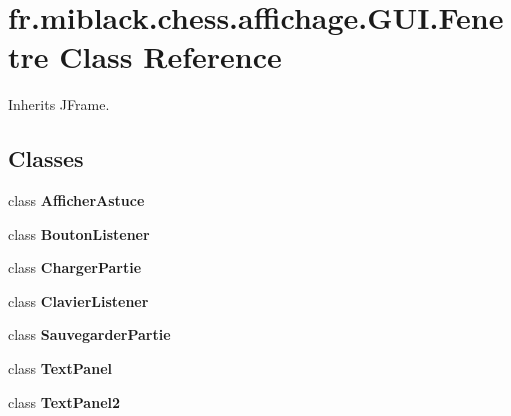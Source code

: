 \section{fr.\-miblack.\-chess.\-affichage.\-G\-U\-I.\-Fenetre Class Reference}
\label{classfr_1_1miblack_1_1chess_1_1affichage_1_1GUI_1_1Fenetre}


Inherits J\-Frame.

\subsection*{Classes}
\begin{DoxyCompactItemize}
\item 
class {\bfseries Afficher\-Astuce}
\item 
class {\bfseries Bouton\-Listener}
\item 
class {\bfseries Charger\-Partie}
\item 
class {\bfseries Clavier\-Listener}
\item 
class {\bfseries Sauvegarder\-Partie}
\item 
class {\bfseries Text\-Panel}
\item 
class {\bfseries Text\-Panel2}
\end{DoxyCompactItemize}
